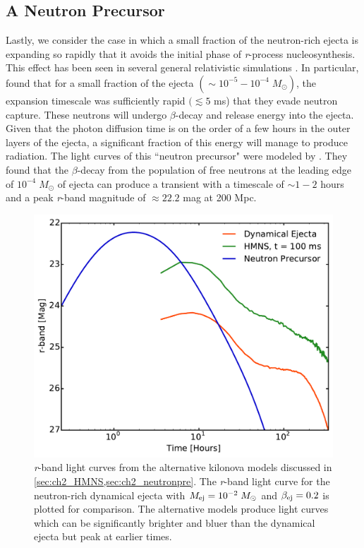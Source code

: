 \subsection{A Neutron Precursor}
\label{sec:ch2_neutronpre}
Lastly, we consider the case in which a small fraction of the neutron-rich ejecta is expanding so rapidly that it avoids the initial phase of {\em r}-process nucleosynthesis. This effect has been seen in several general relativistic simulations \citep{Bauswein+13b,Goriely+15,Just+15}. In particular, \citet{Bauswein+13b} found that for a small fraction of the ejecta $(\sim 10^{-5} - 10^{-4}\; M_{\odot})$, the expansion timescale was sufficiently rapid $(\lesssim 5$ ms) that they evade neutron capture. These neutrons will undergo $\beta$-decay and release energy into the ejecta. Given that the photon diffusion time is on the order of a few hours in the outer layers of the ejecta, a significant fraction of this energy will manage to produce radiation. The light curves of this ``neutron precursor" were modeled by \citet{Metzger+15}. They found that the $\beta$-decay from the population of free neutrons at the leading edge of $10^{-4}\;M_{\odot}$ of ejecta can produce a transient with a timescale of $\sim1-2$ hours and a peak {\em r}-band magnitude of $\approx 22.2$ mag at 200 Mpc.

\begin{figure}[h!]
\centering
\includegraphics[width=\textwidth]{./figs/chapter2/ch2_f18.pdf}
\caption{{\em r}-band light curves from the alternative kilonova models discussed in \cref{sec:ch2_HMNS,sec:ch2_neutronpre}. The {\em r}-band light curve for the neutron-rich dynamical ejecta with $M_{{\rm ej}} = 10^{-2}\;M_{\odot}$ and $\beta_{{\rm ej}} = 0.2$ is plotted for comparison. The alternative models produce light curves which can be significantly brighter and bluer than the dynamical ejecta but peak at earlier times.}
\label{fig:ch2_altLC}
\end{figure}

